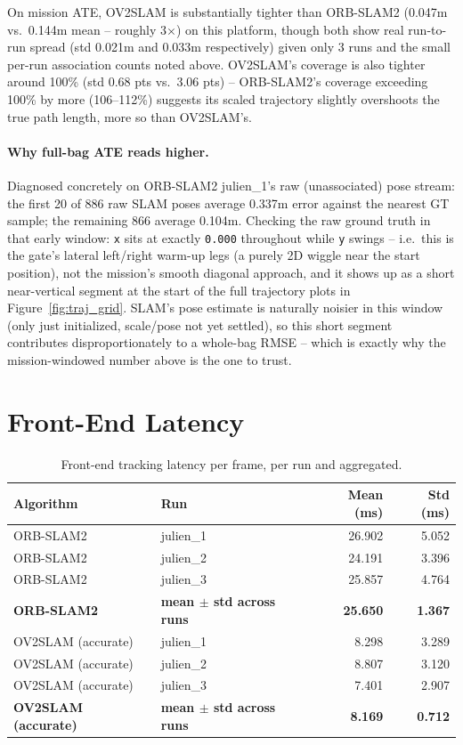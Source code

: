 \documentclass[11pt]{article}
\begin{document}
On mission ATE, OV2SLAM is substantially tighter than ORB-SLAM2 (0.047m vs.\
0.144m mean -- roughly 3$\times$) on this platform, though both show real
run-to-run spread (std 0.021m and 0.033m respectively) given only 3 runs and
the small per-run association counts noted above. OV2SLAM's coverage is also
tighter around 100\% (std 0.68 pts vs.\ 3.06 pts) -- ORB-SLAM2's coverage
exceeding 100\% by more (106--112\%) suggests its scaled trajectory slightly
overshoots the true path length, more so than OV2SLAM's.

\paragraph{Why full-bag ATE reads higher.} Diagnosed concretely on ORB-SLAM2
julien\_1's raw (unassociated) pose stream: the first 20 of 886 raw SLAM poses
average 0.337m error against the nearest GT sample; the remaining 866 average
0.104m. Checking the raw ground truth in that early window: \texttt{x} sits at
exactly \texttt{0.000} throughout while \texttt{y} swings -- i.e.\ this is the
gate's lateral left/right warm-up legs (a purely 2D wiggle near the start
position), not the mission's smooth diagonal approach, and it shows up as a
short near-vertical segment at the start of the full trajectory plots in
Figure~\ref{fig:traj_grid}. SLAM's pose estimate is naturally noisier in this
window (only just initialized, scale/pose not yet settled), so this short
segment contributes disproportionately to a whole-bag RMSE -- which is exactly
why the mission-windowed number above is the one to trust.

\section{Front-End Latency}

\begin{table}[h]
\centering
\caption{Front-end tracking latency per frame, per run and aggregated.}
\label{tab:frontend}
\begin{tabular}{llrr}
\toprule
Algorithm & Run & Mean (ms) & Std (ms) \\
\midrule
ORB-SLAM2 & julien\_1 & 26.902 & 5.052 \\
ORB-SLAM2 & julien\_2 & 24.191 & 3.396 \\
ORB-SLAM2 & julien\_3 & 25.857 & 4.764 \\
\textbf{ORB-SLAM2} & \textbf{mean $\pm$ std across runs} & \textbf{25.650} & \textbf{1.367} \\
\addlinespace
OV2SLAM (accurate) & julien\_1 & 8.298 & 3.289 \\
OV2SLAM (accurate) & julien\_2 & 8.807 & 3.120 \\
OV2SLAM (accurate) & julien\_3 & 7.401 & 2.907 \\
\textbf{OV2SLAM (accurate)} & \textbf{mean $\pm$ std across runs} & \textbf{8.169} & \textbf{0.712} \\
\bottomrule
\end{tabular}
\end{table}
\end{document}
